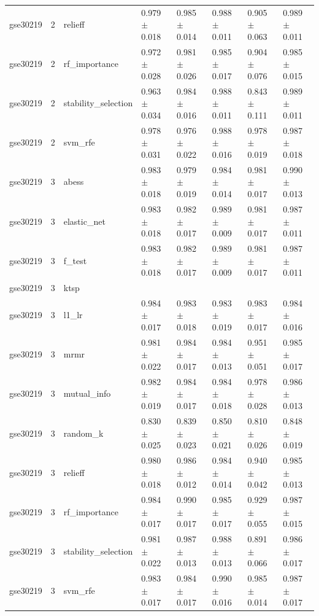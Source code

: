 \begin{table}[t]
\begin{tabular}{llllllll}
    gse30219 & 2 & relieff & 0.979 $\pm$ 0.018 & 0.985 $\pm$ 0.014 & 0.988 $\pm$ 0.011 & 0.905 $\pm$ 0.063 & 0.989 $\pm$ 0.011 \\
    gse30219 & 2 & rf\_importance & 0.972 $\pm$ 0.028 & 0.981 $\pm$ 0.026 & 0.985 $\pm$ 0.017 & 0.904 $\pm$ 0.076 & 0.985 $\pm$ 0.015 \\
    gse30219 & 2 & stability\_selection & 0.963 $\pm$ 0.034 & 0.984 $\pm$ 0.016 & 0.988 $\pm$ 0.011 & 0.843 $\pm$ 0.111 & 0.989 $\pm$ 0.011 \\
    gse30219 & 2 & svm\_rfe & 0.978 $\pm$ 0.031 & 0.976 $\pm$ 0.022 & 0.988 $\pm$ 0.016 & 0.978 $\pm$ 0.019 & 0.987 $\pm$ 0.018 \\
    gse30219 & 3 & abess & 0.983 $\pm$ 0.018 & 0.979 $\pm$ 0.019 & 0.984 $\pm$ 0.014 & 0.981 $\pm$ 0.017 & 0.990 $\pm$ 0.013 \\
    gse30219 & 3 & elastic\_net & 0.983 $\pm$ 0.018 & 0.982 $\pm$ 0.017 & 0.989 $\pm$ 0.009 & 0.981 $\pm$ 0.017 & 0.987 $\pm$ 0.011 \\
    gse30219 & 3 & f\_test & 0.983 $\pm$ 0.018 & 0.982 $\pm$ 0.017 & 0.989 $\pm$ 0.009 & 0.981 $\pm$ 0.017 & 0.987 $\pm$ 0.011 \\
    gse30219 & 3 & ktsp &  &  &  &  &  \\
    gse30219 & 3 & l1\_lr & 0.984 $\pm$ 0.017 & 0.983 $\pm$ 0.018 & 0.983 $\pm$ 0.019 & 0.983 $\pm$ 0.017 & 0.984 $\pm$ 0.016 \\
    gse30219 & 3 & mrmr & 0.981 $\pm$ 0.022 & 0.984 $\pm$ 0.017 & 0.984 $\pm$ 0.013 & 0.951 $\pm$ 0.051 & 0.985 $\pm$ 0.017 \\
    gse30219 & 3 & mutual\_info & 0.982 $\pm$ 0.019 & 0.984 $\pm$ 0.017 & 0.984 $\pm$ 0.018 & 0.978 $\pm$ 0.028 & 0.986 $\pm$ 0.013 \\
    gse30219 & 3 & random\_k & 0.830 $\pm$ 0.025 & 0.839 $\pm$ 0.023 & 0.850 $\pm$ 0.021 & 0.810 $\pm$ 0.026 & 0.848 $\pm$ 0.019 \\
    gse30219 & 3 & relieff & 0.980 $\pm$ 0.018 & 0.986 $\pm$ 0.012 & 0.984 $\pm$ 0.014 & 0.940 $\pm$ 0.042 & 0.985 $\pm$ 0.013 \\
    gse30219 & 3 & rf\_importance & 0.984 $\pm$ 0.017 & 0.990 $\pm$ 0.017 & 0.985 $\pm$ 0.017 & 0.929 $\pm$ 0.055 & 0.987 $\pm$ 0.015 \\
    gse30219 & 3 & stability\_selection & 0.981 $\pm$ 0.022 & 0.987 $\pm$ 0.013 & 0.988 $\pm$ 0.013 & 0.891 $\pm$ 0.066 & 0.986 $\pm$ 0.017 \\
    gse30219 & 3 & svm\_rfe & 0.983 $\pm$ 0.017 & 0.984 $\pm$ 0.017 & 0.990 $\pm$ 0.016 & 0.985 $\pm$ 0.014 & 0.987 $\pm$ 0.017 \\

\end{tabular}
\end{table}
